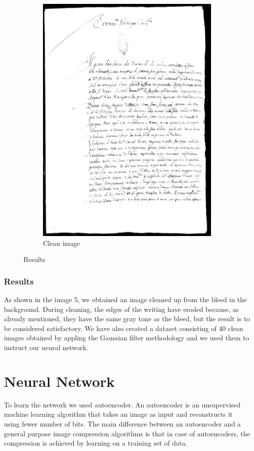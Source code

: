 \documentclass[%
 reprint,
 amsmath,amssymb,
 aps,
]{revtex4-1}
\begin{document}
\begin{figure}
\begin{subfigure}{.9\columnwidth}
\includegraphics[width=\columnwidth]{35p}%
\caption{Clean image}%
\label{subfigb}%
\end{subfigure}\hfill%
\caption{Results}
\label{figabc}
\end{figure}

\subsubsection{Results}
As shown in the image 5, we obtained an image cleaned up from the bleed in the background. During cleaning, the edges of the writing have eroded because, as already mentioned, they have the same gray tone as the bleed, but the result is to be considered satisfactory. We have also created a dataset consisting of 40 clean images obtained by appling the Gaussian filter methodology and we used them to instruct our neural network.

\section{\label{sec:level3}Neural Network}
To learn the network we used autoencoder.
An autoencoder is an unsupervised machine learning algorithm that takes an image as input and reconstructs it using fewer number of bits. The main difference between an autoencoder and a general purpose image compression algorithms is that in case of autoencoders, the compression is achieved by learning on a training set of data.
\end{document}

